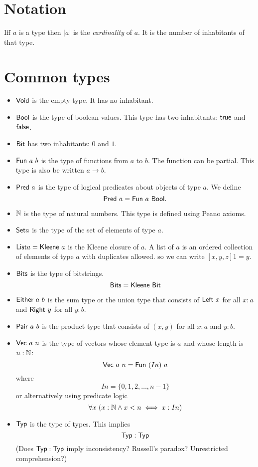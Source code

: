 \section{Notation}

Iff \(a\) is a type then \(|a|\) is the \emph{cardinality} of \(a\).
It is the number of inhabitants of that type.

\section{Common types}

\begin{itemize}
    \item
        $\mathsf{Void}$ is the empty type.
        It has no inhabitant.
    \item
        $\textsf{Bool}$ is the type of boolean values.
        This type has two inhabitants: $\textsf{true}$ and $\textsf{false}$.
    \item
        $\textsf{Bit}$ has two inhabitants: $0$ and $1$.
    \item
        $\mathsf{Fun}~a~b$ is the type of functions from $a$ to $b$.
        The function can be partial.
        This type is also be written $a \to b$.
    \item
        $\mathsf{Pred}~a$ is the type of
        logical predicates about objects of type $a$.
        We define
        \[ \mathsf{Pred}~a = \mathsf{Fun}~a~\textsf{Bool}. \]
    \item
        $\mathbb{N}$ is the type of natural numbers.
        This type is defined using Peano axioms.
    \item
        $\textsf{Set}{a}$ is the type of the set of elements of type $a$.
    \item $\textsf{List}{a} = \mathsf{Kleene}~a$ is the Kleene closure of $a$.
        A list of $a$ is an ordered collection of elements of type $a$ with duplicates allowed.
        so we can write $[x,y,z] 1 = y$.
    \item $\textsf{Bits}$ is the type of bitstrings.
        \[
            \textsf{Bits} = \mathsf{Kleene}~\textsf{Bit}
        \]
    \item $\mathsf{Either}~a~b$ is the sum type or the union type
        that consists of $\mathsf{Left}~x$ for all $x : a$
        and $\mathsf{Right}~y$ for all $y : b$.
    \item $\mathsf{Pair}~a~b$ is the product type
        that consists of $(x,y)$ for all $x : a$ and $y : b$.
    \item
        $\mathsf{Vec}~a~n$ is the type of vectors
        whose element type is $a$ and whose length is $n : \mathbb{N}$:
        \[ \mathsf{Vec}~a~n = \mathsf{Fun}~(I n)~a \]
        where
        \[ I n = \{ 0, 1, 2, \ldots, n - 1 \} \]
        or alternatively using predicate logic
        \[ \forall x~ (x : \mathbb{N} \wedge x < n \iff x : I n) \]
    \item $\mathsf{Typ}$ is the type of types.
        This implies
        \[ \mathsf{Typ} : \mathsf{Typ} \]
        (Does $\mathsf{Typ} : \mathsf{Typ}$ imply inconsistency?
        Russell's paradox?
        Unrestricted comprehension?)


\end{itemize}
